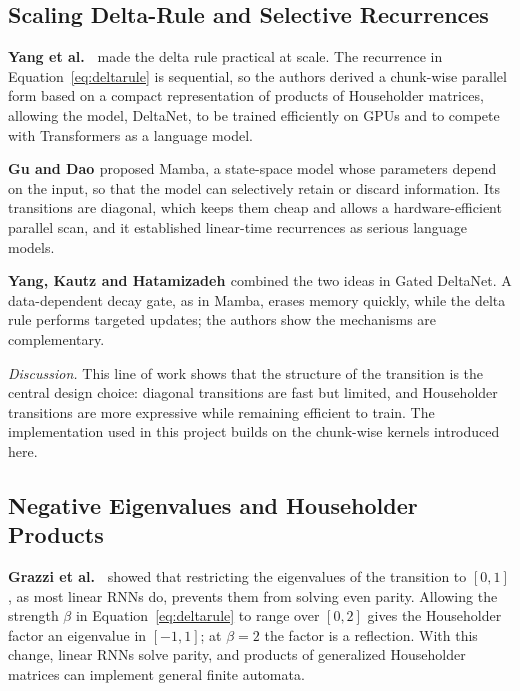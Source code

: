 \subsection{Scaling Delta-Rule and Selective Recurrences}
\textbf{Yang et al.\ \cite{deltanet}} made the delta rule practical at scale. The recurrence in Equation~\ref{eq:deltarule} is sequential, so the authors derived a chunk-wise parallel form based on a compact representation of products of Householder matrices, allowing the model, DeltaNet, to be trained efficiently on GPUs and to compete with Transformers as a language model.

\textbf{Gu and Dao \cite{mamba}} proposed Mamba, a state-space model whose parameters depend on the input, so that the model can selectively retain or discard information. Its transitions are diagonal, which keeps them cheap and allows a hardware-efficient parallel scan, and it established linear-time recurrences as serious language models.

\textbf{Yang, Kautz and Hatamizadeh \cite{gateddeltanet}} combined the two ideas in Gated DeltaNet. A data-dependent decay gate, as in Mamba, erases memory quickly, while the delta rule performs targeted updates; the authors show the mechanisms are complementary.

\textit{Discussion.} This line of work shows that the structure of the transition is the central design choice: diagonal transitions are fast but limited, and Householder transitions are more expressive while remaining efficient to train. The implementation used in this project builds on the chunk-wise kernels introduced here.

\subsection{Negative Eigenvalues and Householder Products}
\textbf{Grazzi et al.\ \cite{negeig}} showed that restricting the eigenvalues of the transition to $[0,1]$, as most linear RNNs do, prevents them from solving even parity. Allowing the strength $\beta$ in Equation~\ref{eq:deltarule} to range over $[0,2]$ gives the Householder factor an eigenvalue in $[-1,1]$; at $\beta=2$ the factor is a reflection. With this change, linear RNNs solve parity, and products of generalized Householder matrices can implement general finite automata.

